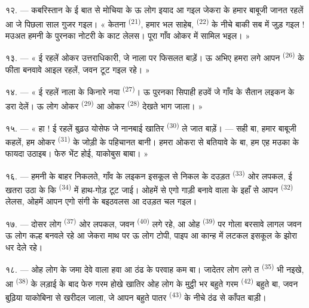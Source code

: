 १२. --- कबरिस्तान के ई बात से मोचिया के ऊ लोग इयाद आ गइल जेकरा के
हमार बाबूजी जानत रहलें आ जे पिछला साल गुजर गइल। « केतना 
\textsuperscript{(21)}, हमार भल साहेब,  \textsuperscript{(22)}
के नीचे बाकी सब में जुड़ गइल ! मउअत हमनी के पुरनका नोटरी के काट लेलस।
पूरा गाँव ओकर  में सामिल भइल। »

१३. --- « ई रहलें ओकर उत्तराधिकारी, जे नाला पर फिसलत बाड़ें। ऊ अभिए
हमरा लगे आपन  \textsuperscript{(26)} के फीता बनवावे
आइल रहलें, जवन टूट गइल रहे। »

१४. --- « ई रहलें नाला के किनारे नया 
\textsuperscript{(27)}। ऊ पुरनका सिपाही हउवें जे गाँव के सैतान लइकन के
डरा देलें। ऊ लोग ओकर  \textsuperscript{(29)} आ ओकर
 \textsuperscript{(28)} देखते भाग जाला। »

१५. --- « हा ! ई रहलें बुढ़उ योसेफ जे नानबाई खातिर  \textsuperscript{(30)} ले जात बाड़ें। --- सही बा, हमार
बाबूजी कहलें, हम ओकर  \textsuperscript{(31)} के जोड़ी के
पहिचानत बानी। हमरा ओकरा से बतियावे के बा, हम एह मउका के फायदा उठाइब।
फेरु भेंट होई, याकोबुस बाबा। »

१६. --- हमनी के बाहर निकलते, गाँव के लइकन इसकूल से निकल के दउड़त
 \textsuperscript{(33)} ओर लपकल, ई खतरा उठा के कि
 \textsuperscript{(34)} में हाथ-गोड़ टूट जाई। ओहमें से एगो
गाड़ी बनावे वाला के इहाँ से आपन  \textsuperscript{(32)}
लेलस, ओहमें आपन एगो संगी के बइठवलस आ दउड़त चल गइल।

१७. --- दोसर लोग  \textsuperscript{(37)} ओर लपकल,
जवन  \textsuperscript{(40)} लगे रहे, आ ओह  \textsuperscript{(39)} पर गोला बरसावे लागल जवन ऊ लोग कल्ह बनवले रहे
आ जेकरा माथ पर ऊ लोग टोपी, पाइप आ कान्ह में लटकल इसकूल के झोरा धर देले
रहे।

१८. --- ओह लोग के जमा देवे वाला हवा आ ठंढ के परवाह कम बा। जादेतर लोग
लगे त  \textsuperscript{(35)} भी नइखे, आ  \textsuperscript{(38)} के लड़ाई के बाद फेरु गरम होखे खातिर ओह लोग
के मुट्ठी भर बहुते गरम  \textsuperscript{(42)} बहुते बा,
जवन बुढ़िया  याकोबिना से खरीदल जाला, जे आपन बहुते
पातर  \textsuperscript{(43)} के नीचे ठंढ से काँपत बाड़ी।

\VUsaut{3.0mm}
\VUsaut{3.0mm}

